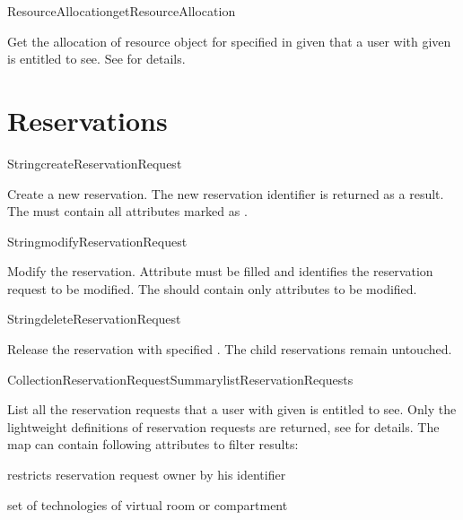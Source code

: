 \begin{Api}
\begin{ApiCmd}{ResourceAllocation}{getResourceAllocation}%
%
%
%
\end{ApiCmd}
Get the allocation of resource object for specified  in given  that a user with given  is entitled to see. See  for details.

\end{Api}


\section{Reservations}

\begin{Api}

\begin{ApiCmd}{String}{createReservationRequest}%
%
%
\end{ApiCmd}
Create a new reservation. The new reservation identifier is returned as a result. The  must contain all attributes marked as \ApiRequired.

\begin{ApiCmd}{String}{modifyReservationRequest}%
%
%
\end{ApiCmd}
Modify the reservation. Attribute  must be filled and identifies the reservation request to be modified. The  should contain only attributes to be modified.

\begin{ApiCmd}{String}{deleteReservationRequest}%
%
%
\end{ApiCmd}
Release the reservation with specified . The child reservations remain untouched.

\begin{ApiCmdCollection}{Collection}{ReservationRequestSummary}{listReservationRequests}%
%
%
\end{ApiCmdCollection}
List all the reservation requests that a user with given  is entitled to see. Only the lightweight definitions of reservation requests are returned, see  for details. The  map can contain following attributes to filter results:
\begin{compactitem}
\item {} restricts reservation request owner by his identifier
\item {} set of technologies of virtual room or compartment
\end{compactitem}


\end{Api}
